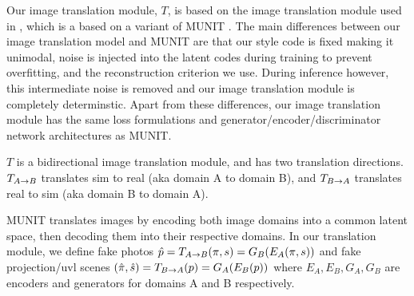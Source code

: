 \documentclass{article}
\begin{document}




Our image translation module, $T$, is based on the image translation module used in \citep{surgical_video_translation}, which is a based on a variant \cite{surgical_image_translation} of MUNIT \cite{munit}. The main differences between our image translation model and MUNIT are that our style code is fixed making it unimodal, noise is injected into the latent codes during training to prevent overfitting, and the reconstruction criterion we use. During inference however, this intermediate noise is removed and our image translation module is completely determinstic. Apart from these differences, our image translation module has the same loss formulations and generator/encoder/discriminator network architectures as MUNIT. 

$T$ is a bidirectional image translation module, and has two translation directions. $T_{A\rightarrow B}$ translates sim to real (aka domain A to domain B), and $T_{B\rightarrow A}$ translates real to sim (aka domain B to domain A).

MUNIT translates images by encoding both image domains into a common latent space, then decoding them into their respective domains.
In our translation module, we define fake photos $\hat{p} = T_{A\rightarrow B}(\pi,s) = G_B(E_A(\pi,s))$ and fake projection/uvl scenes $(\hat{\pi},\hat{s}) = T_{B\rightarrow A}(p) = G_A(E_B(p))$
	where $E_A, E_B, G_A, G_B$ are encoders and generators for domains A and B respectively.

\end{document}
